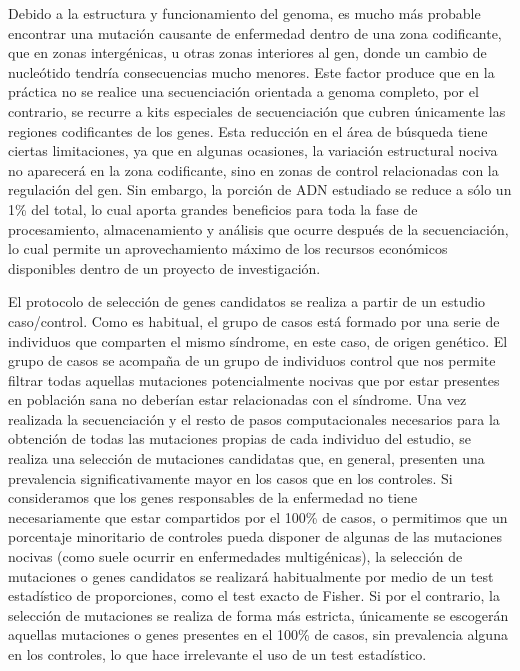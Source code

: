 \medskip
Debido a la estructura y funcionamiento del genoma, es mucho más probable encontrar una mutación causante de enfermedad dentro de una zona codificante, que en zonas intergénicas, u otras zonas interiores al gen, donde un cambio de nucleótido tendría consecuencias mucho menores. Este factor produce que en la práctica no se realice una secuenciación orientada a genoma completo, por el contrario, se recurre a kits especiales de secuenciación que cubren únicamente las regiones codificantes de los genes. Esta reducción en el área de búsqueda tiene ciertas limitaciones, ya que en algunas ocasiones, la variación estructural nociva no aparecerá en la zona codificante, sino en zonas de control relacionadas con la regulación del gen. Sin embargo, la porción de ADN estudiado se reduce a sólo un 1\% del total, lo cual aporta grandes beneficios para toda la fase de procesamiento, almacenamiento y análisis que ocurre después de la secuenciación, lo cual permite un aprovechamiento máximo de los recursos económicos disponibles dentro de un proyecto de investigación. 

\medskip
El protocolo de selección de genes candidatos se realiza a partir de un estudio caso/control. Como es habitual, el grupo de casos está formado por una serie de individuos que comparten el mismo síndrome, en este caso, de origen genético. El grupo de casos se acompaña de un grupo de individuos control que nos permite filtrar todas aquellas mutaciones potencialmente nocivas que por estar presentes en población sana no deberían estar relacionadas con el síndrome. Una vez realizada la secuenciación y el resto de pasos computacionales necesarios para la obtención de todas las mutaciones propias de cada individuo del estudio, se realiza una selección de mutaciones candidatas que, en general, presenten una prevalencia significativamente mayor en los casos que en los controles. Si consideramos que los genes responsables de la enfermedad no tiene necesariamente que estar compartidos por el 100\% de casos, o permitimos que un porcentaje minoritario de controles pueda disponer de algunas de las mutaciones nocivas (como suele ocurrir en enfermedades multigénicas), la selección de mutaciones o genes candidatos se realizará habitualmente por medio de un test estadístico de proporciones, como el test exacto de Fisher. Si por el contrario, la selección de mutaciones se realiza de forma más estricta, únicamente se escogerán aquellas mutaciones o genes presentes en el 100\% de casos, sin prevalencia alguna en los controles, lo que hace irrelevante el uso de un test estadístico. 

